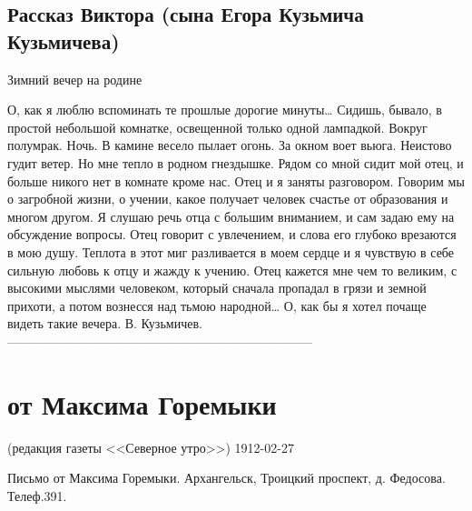 \documentclass[]{memoir}
\begin{document}
\subsection{Рассказ Виктора (сына Егора Кузьмича Кузьмичева)}

Зимний вечер на родине

О, как я люблю вспоминать те прошлые дорогие минуты…
Сидишь, бывало, в простой небольшой комнатке, освещенной только одной лампадкой. Вокруг полумрак. Ночь. В камине весело пылает огонь. За окном воет вьюга. Неистово гудит ветер. Но мне тепло в родном гнездышке. Рядом со мной сидит мой отец, и больше никого нет в комнате  кроме нас. Отец и я заняты разговором. Говорим мы о загробной жизни, о учении, какое получает человек счастье от образования и многом другом. Я слушаю речь отца с большим вниманием, и сам задаю ему на обсуждение вопросы. Отец говорит с увлечением, и слова его глубоко врезаются в мою душу. Теплота в этот миг разливается в моем сердце и я чувствую в себе сильную любовь к отцу и жажду к учению. Отец кажется мне чем то великим, с высокими мыслями человеком, который сначала пропадал в грязи и земной прихоти, а потом вознесся над тьмою народной…
О, как бы я хотел почаще видеть такие вечера. 
В. Кузьмичев.
------------------------------------------------------------------------


\section{от Максима Горемыки}
(редакция газеты <<Северное утро>>)
{1912-02-27}

Письмо от Максима Горемыки.
Архангельск,
Троицкий проспект, д. Федосова.
Телеф.391.
\end{document}

